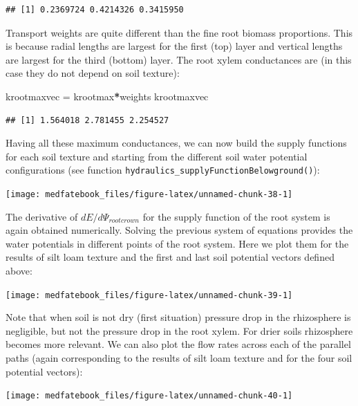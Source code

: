 \documentclass[]{book}
\newenvironment{Shaded}{\begin{snugshade}}{\end{snugshade}}
\newcommand{\StringTok}[1]{\textcolor[rgb]{0.31,0.60,0.02}{#1}}
\newcommand{\OperatorTok}[1]{\textcolor[rgb]{0.81,0.36,0.00}{\textbf{#1}}}
\newcommand{\NormalTok}[1]{#1}
\begin{document}
\begin{verbatim}
## [1] 0.2369724 0.4214326 0.3415950
\end{verbatim}

Transport weights are quite different than the fine root biomass proportions. This is because radial lengths are largest for the first (top) layer and vertical lengths are largest for the third (bottom) layer. The root xylem conductances are (in this case they do not depend on soil texture):

\begin{Shaded}
\begin{Highlighting}[]
\NormalTok{krootmaxvec =}\StringTok{ }\NormalTok{krootmax}\OperatorTok{*}\NormalTok{weights}
\NormalTok{krootmaxvec}
\end{Highlighting}
\end{Shaded}

\begin{verbatim}
## [1] 1.564018 2.781455 2.254527
\end{verbatim}

Having all these maximum conductances, we can now build the supply functions for each soil texture and starting from the different soil water potential configurations (see function \texttt{hydraulics\_supplyFunctionBelowground()}):

\begin{center}\texttt{[image: medfatebook\_files/figure-latex/unnamed-chunk-38-1]} \end{center}

The derivative of \(dE/d\Psi_{rootcrown}\) for the supply function of the root system is again obtained numerically. Solving the previous system of equations provides the water potentials in different points of the root system. Here we plot them for the results of silt loam texture and the first and last soil potential vectors defined above:

\begin{center}\texttt{[image: medfatebook\_files/figure-latex/unnamed-chunk-39-1]} \end{center}

Note that when soil is not dry (first situation) pressure drop in the rhizosphere is negligible, but not the pressure drop in the root xylem. For drier soils rhizosphere becomes more relevant. We can also plot the flow rates across each of the parallel paths (again corresponding to the results of silt loam texture and for the four soil potential vectors):

\begin{center}\texttt{[image: medfatebook\_files/figure-latex/unnamed-chunk-40-1]} \end{center}
\end{document}
